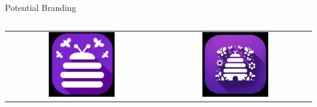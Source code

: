 \documentclass[aspectratio=169]{beamer}
\begin{document}
\begin{frame}{Potential Branding}
\begin{columns}[T]
\begin{column}{0.5\textwidth}
\begin{tabular}{cc}
            \includegraphics[width=0.45\textwidth]{imgs/app_icons/1.png} & \includegraphics[width=0.45\textwidth]{imgs/app_icons/2.png} \\ 
        \end{tabular}
    \end{column}
\end{columns}
\end{frame}
\end{document}
